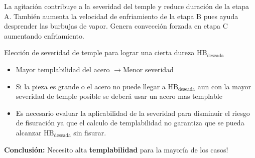 \documentclass{article}
\newcommand{\HB}{\ensuremath{\mathrm{HB}}}
\newcommand{\goright}{\ensuremath{\rightarrow}}
\begin{document}
La agitación contribuye a la severidad del temple y reduce  duración de la etapa A. También aumenta la velocidad de enfriamiento de la etapa B pues ayuda desprender las burbujas de vapor. Genera convección forzada en etapa C aumentando enfriamiento.

Elección de severidad de temple para lograr una cierta dureza $\HB_{\mathrm{deseada}}$
\begin{itemize}
    \item Mayor templabilidad del acero \goright Menor severidad
    \item Si la pieza es grande o el acero no puede llegar a $\HB_{\mathrm{deseada}}$ aun con la mayor severidad de temple posible se deberá usar un acero mas templable
    \item Es necesario evaluar la aplicabilidad de la severidad para disminuir el riesgo de fisuración ya que el calculo de templabilidad no garantiza que se pueda alcanzar $\HB_{\mathrm{deseada}}$ sin fisurar.
\end{itemize}
\textbf{Conclusión:} Necesito alta \textbf{templabilidad} para la mayoría de los casos!
\end{document}
